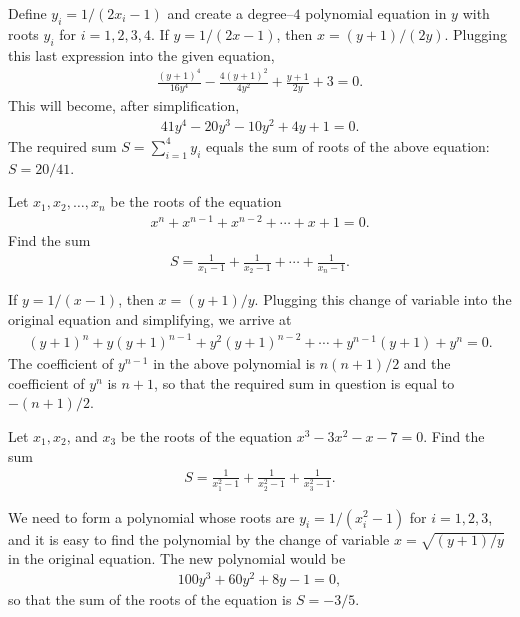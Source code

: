 \begin{solution}
    Define $y_i=1/(2x_i-1)$ and create a degree--$4$ polynomial equation in $y$ with roots $y_i$ for $i=1,2,3,4$. If $y=1/(2x-1)$, then $x=(y+1)/(2y)$. Plugging this last expression into the given equation,
    \begin{align*}
        \frac{(y+1)^4}{16y^4}-\frac{4(y+1)^2}{4y^2} + \frac{y+1}{2y} + 3 = 0.
    \end{align*}
    This will become, after simplification, 
    \begin{align*}
        41y^4-20y^3-10y^2+4y+1=0.
    \end{align*}
    The required sum $S=\sum_{i=1}^4 y_i$ equals the sum of roots of the above equation: $S=20/41$.
\end{solution}



\begin{question}
    Let $x_1,x_2,\dots,x_n$ be the roots of the equation
    \begin{align*}
        x^n + x^{n-1} + x^{n-2} + \cdots + x + 1 =0.
    \end{align*}
    Find the sum
    \begin{align*}
        S = \frac{1}{x_1-1}+\frac{1}{x_2-1}+\cdots + \frac{1}{x_n-1}.
    \end{align*}
\end{question}

\begin{solution}
    If $y=1/(x-1)$, then $x=(y+1)/y$. Plugging this change of variable into the original equation and simplifying, we arrive at
    \begin{align*}
        (y+1)^n + y(y+1)^{n-1} + y^2(y+1)^{n-2} + \cdots + y^{n-1}(y+1)+y^n=0.
    \end{align*}
    The coefficient of $y^{n-1}$ in the above polynomial is $n(n+1)/2$ and the coefficient of $y^n$ is $n+1$, so that the required sum in question is equal to $-(n+1)/2$.
\end{solution}



\begin{question}
    Let $x_1,x_2$, and $x_3$ be the roots of the equation $x^3-3x^2-x-7=0$. Find the sum
    \begin{align*}
        S = \frac{1}{x_1^2-1}+\frac{1}{x_2^2-1}+\frac{1}{x_3^2-1}.
    \end{align*}
\end{question}

\begin{solution}
    We need to form a polynomial whose roots are $y_i=1/(x_i^2-1)$ for $i=1,2,3$, and it is easy to find the polynomial by the change of variable $x=\sqrt{(y+1)/y}$ in the original equation. The new polynomial would be
    \begin{align*}
        100y^3 + 60y^2 + 8y - 1 =0,
    \end{align*}
    so that the sum of the roots of the equation is $S=-3/5$.
\end{solution}

